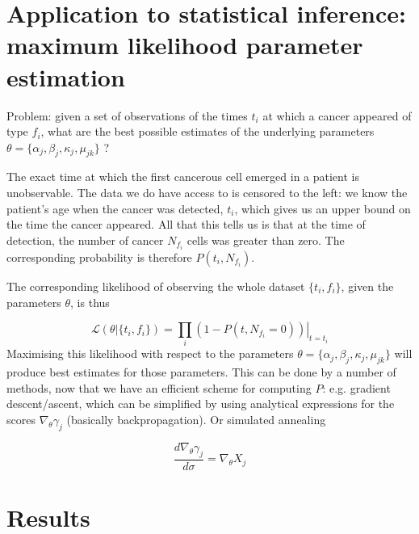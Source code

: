 \documentclass{article}
\begin{document}
\section{Application to statistical inference: maximum likelihood parameter estimation}

Problem: given a set of observations of the times $t_i$ at which a cancer
appeared of type $f_i$, what are the best possible estimates of the underlying
parameters $\theta = \{\alpha_j, \beta_j, \kappa_j, \mu_{jk}\}$ ?

The exact time at which the first cancerous cell emerged in a patient is
unobservable. The data we do have access to is censored to the left:
we know the patient's age when the cancer was detected, $t_i$, which gives us an
upper bound on the time the cancer appeared. All that this tells us is that at
the time of detection, the number of cancer $N_{f_i}$ cells was greater than
zero. The corresponding probability is therefore $P(t_i, N_{f_i})$.

The corresponding likelihood of observing the whole dataset $\{t_i,f_i\}$, given
the parameters $\theta$, is thus


\begin{equation}
    \mathcal{L}(\theta | \{t_i, f_i\}) = \prod_i 
    \left. (1 - P(t, N_{f_i} = 0)) \right|_{t=t_i}
\end{equation}
Maximising this likelihood with respect to the parameters
$\theta = \{\alpha_j, \beta_j, \kappa_j, \mu_{jk}\}$ will produce best estimates
for those parameters.
This can be done by a number of methods, now that we have an efficient scheme
for computing $P$: e.g. gradient descent/ascent, which can be simplified by
using analytical expressions for the scores $\nabla_\theta \gamma_j$ (basically
backpropagation). Or simulated annealing

\begin{equation}
    \frac{d \nabla_\theta \gamma_j}{d \sigma} = \nabla_\theta X_j
\end{equation}

\section{Results}
\end{document}
